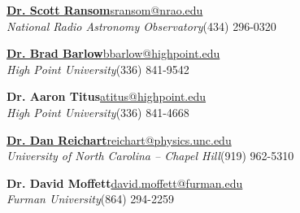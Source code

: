 \documentclass[letterpaper,12pt]{article}
\begin{document}
\vspace{2mm}
\begin{minipage}{6.1in}
\href{https://www.cv.nrao.edu/~sransom/}{{\textbf{Dr. Scott Ransom}}}\hfill \href{mailto:sransom@nrao.edu}{sransom@nrao.edu}\\
\textit{National Radio Astronomy Observatory}\hfill (434) 296-0320

\vspace{3mm}
\href{http://physics.highpoint.edu/~bbarlow/}{{\textbf{Dr. Brad Barlow}}}\hfill \href{mailto:bbarlow@highpoint.edu}{bbarlow@highpoint.edu}\\
\textit{High Point University}\hfill (336) 841-9542


\vspace{3mm}
{\textbf{Dr. Aaron Titus}}\hfill \href{mailto:atitus@highpoint.edu}{atitus@highpoint.edu}\\
\textit{High Point University}\hfill (336) 841-4668


\vspace{3mm}
\href{https://www.danreichart.com/}{{\textbf{Dr. Dan Reichart}}}\hfill \href{mailto:reichart@physics.unc.edu}{reichart@physics.unc.edu}\\
\textit{University of North Carolina -- Chapel Hill}\hfill (919) 962-5310

\vspace{3mm}
{\textbf{Dr. David Moffett}}\hfill \href{mailto:david.moffett@furman.edu}{david.moffett@furman.edu}\\
\textit{Furman University}\hfill (864) 294-2259



\end{minipage}
\end{document}
